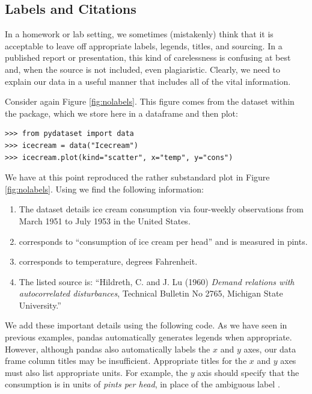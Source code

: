 \subsection*{Labels and Citations} %

In a homework or lab setting, we sometimes (mistakenly) think that it is acceptable to leave off appropriate labels, legends, titles, and sourcing.
In a published report or presentation, this kind of carelessness is confusing at best and, when the source is not included, even plagiaristic.
Clearly, we need to explain our data in a useful manner that includes all of the vital information.

Consider again Figure \ref{fig:nolabels}.
This figure comes from the  dataset within the  package, which we store here in a dataframe and then plot:
\begin{lstlisting}
>>> from pydataset import data
>>> icecream = data("Icecream")
>>> icecream.plot(kind="scatter", x="temp", y="cons")
\end{lstlisting}

We have at this point reproduced the rather substandard plot in Figure \ref{fig:nolabels}.
Using  we find the following information:
\begin{enumerate}
    \item The dataset details ice cream consumption via four-weekly observations from March 1951 to July 1953 in the United States.
    \item {} corresponds to ``consumption of ice cream per head'' and is measured in pints.
    \item {} corresponds to temperature, degrees Fahrenheit.
    \item The listed source is: ``Hildreth, C. and J. Lu (1960) \emph{Demand relations with autocorrelated disturbances}, Technical Bulletin No 2765, Michigan State University.''
\end{enumerate}

We add these important details using the following code.
As we have seen in previous examples, pandas automatically generates legends when appropriate.
However, although pandas also automatically labels the $x$ and $y$ axes, our data frame column titles may be insufficient.
Appropriate titles for the $x$ and $y$ axes must also list appropriate units.
For example, the $y$ axis should specify that the consumption is in units of \emph{pints per head}, in place of the ambiguous label .

